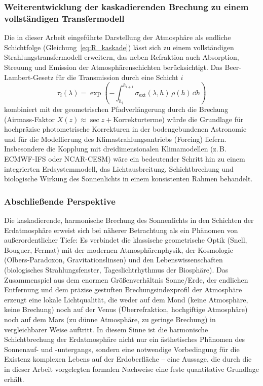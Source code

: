 \documentclass[12pt,a4paper]{article}
\begin{document}
\subsubsection{Weiterentwicklung der kaskadierenden Brechung
               zu einem vollständigen Transfermodell}

Die in dieser Arbeit eingeführte Darstellung der Atmosphäre als
endliche Schichtfolge (Gleichung~\ref{eq:R_kaskade}) lässt sich
zu einem vollständigen Strahlungs\-transfermodell erweitern,
das neben Refraktion auch Absorption, Streuung und Emission
der Atmosphärenschichten berücksichtigt.
Das Beer-Lambert-Gesetz für die Transmission durch eine Schicht $i$
\begin{equation}
  \tau_i(\lambda) = \exp\!\left(-\int_{h_i}^{h_{i+1}}
    \sigma_{\mathrm{ext}}(\lambda,h)\,\rho(h)\,\dd h \right)
  \label{eq:beer_lambert}
\end{equation}
kombiniert mit der geometrischen Pfadverlängerung durch die Brechung
(Airmass-Faktor $X(z) \approx \sec z + \text{Korrekturterme}$)
würde die Grundlage für hochpräzise photometrische Korrekturen
in der bodengebundenen Astronomie und für die Modellierung des
Klimastrahlungsantriebs (Forcing) liefern.
Insbesondere die Kopplung mit dreidimensionalen Klimamodellen
(z.\,B. ECMWF-IFS oder NCAR-CESM) wäre ein bedeutender Schritt
hin zu einem integrierten Erd\-system\-modell,
das Lichtausbreitung, Schichtbrechung und biologische
Wirkung des Sonnenlichts in einem konsistenten Rahmen behandelt.

\subsubsection{Abschließende Perspektive}

Die kaskadierende, harmonische Brechung des Sonnenlichts in den
Schichten der Erdatmosphäre erweist sich bei näherer Betrachtung
als ein Phänomen von außerordentlicher Tiefe:
Es verbindet die klassische geometrische Optik (Snell, Bouguer, Fermat)
mit der modernen Atmosphärenphysik, der Kosmologie (Olbers-Paradoxon,
Gravitationslinsen) und den Lebenswissenschaften (biologisches
Strahlungsfenster, Tageslichtrhythmus der Biosphäre).
Das Zusammenspiel aus dem enormen Größenverhältnis Sonne/Erde,
der endlichen Entfernung und dem präzise gestuften Brechungsindexprofil
der Atmosphäre erzeugt eine lokale Lichtqualität,
die weder auf dem Mond (keine Atmosphäre, keine Brechung)
noch auf der Venus (Überrefraktion, hochgiftige Atmosphäre)
noch auf dem Mars (zu dünne Atmosphäre, zu geringe Brechung)
in vergleichbarer Weise auftritt.
In diesem Sinne ist die harmonische Schichtbrechung der Erdatmosphäre
nicht nur ein ästhetisches Phänomen des Sonnenauf- und -untergangs,
sondern eine notwendige Vorbedingung für die Existenz komplexen
Lebens auf der Erdoberfläche --
eine Aussage, die durch die in dieser Arbeit vorgelegten formalen
Nachweise eine feste quantitative Grundlage erhält.
\end{document}
